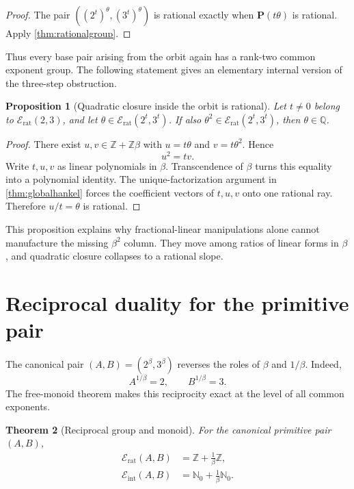 \documentclass[11pt]{article}
\numberwithin{equation}{section}
\newtheorem{theorem}{Theorem}[section]
\newtheorem{proposition}[theorem]{Proposition}
\theoremstyle{definition}
\newcommand{\Q}{\mathbb{Q}}
\newcommand{\Z}{\mathbb{Z}}
\newcommand{\N}{\mathbb{N}}
\newcommand{\Pair}{\mathbf P}
\newcommand{\Erat}{\mathcal E_{\mathrm{rat}}}
\newcommand{\Eint}{\mathcal E_{\mathrm{int}}}
\begin{document}
\begin{proof}
The pair \(((2^t)^\theta,(3^t)^\theta)\) is rational exactly when \(\Pair(t\theta)\) is rational. Apply \cref{thm:rationalgroup}.
\end{proof}

Thus every base pair arising from the orbit again has a rank-two common exponent group. The following statement gives an elementary internal version of the three-step obstruction.

\begin{proposition}[Quadratic closure inside the orbit is rational]\label{prop:quadraticclosure}
Let \(t\ne0\) belong to \(\Erat(2,3)\), and let \(\theta\in\Erat(2^t,3^t)\). If also \(\theta^2\in\Erat(2^t,3^t)\), then \(\theta\in\Q\).
\end{proposition}

\begin{proof}
There exist \(u,v\in\Z+\Z\beta\) with \(u=t\theta\) and \(v=t\theta^2\). Hence
\[
       u^2=tv.
\]
Write \(t,u,v\) as linear polynomials in \(\beta\). Transcendence of \(\beta\) turns this equality into a polynomial identity. The unique-factorization argument in \cref{thm:globalhankel} forces the coefficient vectors of \(t,u,v\) onto one rational ray. Therefore \(u/t=\theta\) is rational.
\end{proof}

This proposition explains why fractional-linear manipulations alone cannot manufacture the missing \(\beta^2\) column. They move among ratios of linear forms in \(\beta\), and quadratic closure collapses to a rational slope.

\section{Reciprocal duality for the primitive pair}

The canonical pair \((A,B)=(2^\beta,3^\beta)\) reverses the roles of \(\beta\) and \(1/\beta\). Indeed,
\[
       A^{1/\beta}=2,
       \qquad
       B^{1/\beta}=3.
\]
The free-monoid theorem makes this reciprocity exact at the level of all common exponents.

\begin{theorem}[Reciprocal group and monoid]\label{thm:reciprocal}
For the canonical primitive pair \((A,B)\),
\begin{align}
 \Erat(A,B)&=\Z+\frac{1}{\beta}\Z,\label{eq:reciprat}\\
 \Eint(A,B)&=\N_0+\frac{1}{\beta}\N_0.\label{eq:recipint}
\end{align}
\end{theorem}
\end{document}
